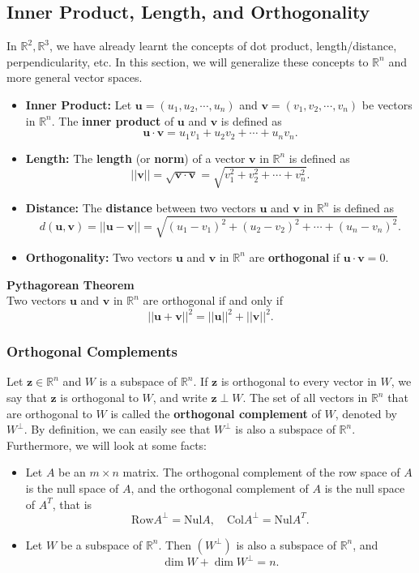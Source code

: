 \documentclass[10pt, a4paper]{article}
\newcommand{\R}{\mathbb{R}}
\newcommand{\vt}[1]{\mathbf{#1}}
\begin{document}
\subsection{Inner Product, Length, and Orthogonality}
\indent In $\R^2, \R^3$, we have already learnt the concepts of dot product, length/distance, perpendicularity, etc. In this section, we will generalize these concepts to $\R^n$ and more general vector spaces.
\begin{itemize}
    \item \textbf{Inner Product:} Let $\vt{u} = (u_1, u_2, \cdots, u_n)$ and $\vt{v} = (v_1, v_2, \cdots, v_n)$ be vectors in $\R^n$. The \textbf{inner product} of $\vt{u}$ and $\vt{v}$ is defined as\[ \vt{u} \cdot \vt{v} = u_1v_1 + u_2v_2 + \cdots + u_nv_n. \]
    \item \textbf{Length:} The \textbf{length} (or \textbf{norm}) of a vector $\vt{v}$ in $\R^n$ is defined as\[ ||\vt{v}|| = \sqrt{\vt{v} \cdot \vt{v}} = \sqrt{v_1^2 + v_2^2 + \cdots + v_n^2}. \] 
    \item \textbf{Distance:} The \textbf{distance} between two vectors $\vt{u}$ and $\vt{v}$ in $\R^n$ is defined as\[ d(\vt{u}, \vt{v}) = ||\vt{u} - \vt{v}|| = \sqrt{(u_1 - v_1)^2 + (u_2 - v_2)^2 + \cdots + (u_n - v_n)^2}. \]
    \item \textbf{Orthogonality:} Two vectors $\vt{u}$ and $\vt{v}$ in $\R^n$ are \textbf{orthogonal} if $\vt{u} \cdot \vt{v} = 0$.
\end{itemize}
\begin{proposition}
    \textbf{Pythagorean Theorem}\\ Two vectors $\vt{u}$ and $\vt{v}$ in $\R^n$ are orthogonal if and only if\[ ||\vt{u} + \vt{v}||^2 = ||\vt{u}||^2 + ||\vt{v}||^2. \]
\end{proposition}
\subsubsection*{Orthogonal Complements}
\indent Let $\vt{z}\in \R^n$ and $W$ is a subspace of $\R^n$. If $\vt{z}$ is orthogonal to every vector in $W$, we say that $\vt{z}$ is orthogonal to $W$, and write $\vt{z}\perp W$. The set of all vectors in $\R^n$ that are orthogonal to $W$ is called the \textbf{orthogonal complement} of $W$, denoted by $W^\perp$. 
By definition, we can easily see that $W^\perp$ is also a subspace of $\R^n$. Furthermore, we will look at some facts:
\begin{itemize}
    \item Let $A$ be an $m\times n$ matrix. The orthogonal complement of the row space of $A$ is the null space of $A$, and the orthogonal complement of $A$ is the null space of $A^T$, that is \[ \text{Row}A^\perp = \text{Nul}A, \quad \text{Col}A^\perp = \text{Nul}A^T. \]
    \item Let $W$ be a subspace of $\R^n$. Then $(W^\perp)$ is also a subspace of $\R^n$, and\[
    \operatorname*{dim} W + \operatorname*{dim} W^\perp = n.
    \]
\end{itemize}
\end{document}
